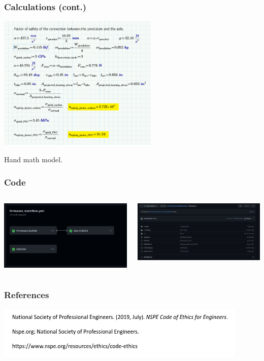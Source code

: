 \documentclass[aspectratio=169]{beamer}
\begin{document}
\begin{frame}
    \frametitle{Calculations (cont.)}

    \includegraphics[height=6.5cm]{CalculationsMatt}

    Hand math model.
\end{frame}

\begin{frame}
    \frametitle{Code}

    \begin{columns}
        \begin{column}{0.48\textwidth}
            \includegraphics[width=6.5cm]{CodePasses}
        \end{column}

        \begin{column}{0.48\textwidth}
            \includegraphics[width=6.5cm]{CodeOnline}
        \end{column}
    \end{columns}
\end{frame}

\begin{frame}
    \frametitle{References}

    \includegraphics[width=12cm]{CDRReferences}
\end{frame}
\end{document}
